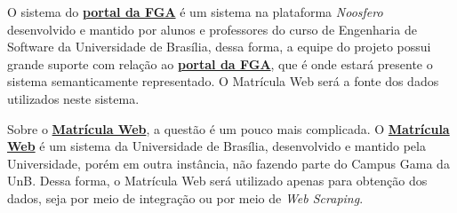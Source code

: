 
O sistema do \href{https://fga.unb.br/}{\textbf{portal da FGA}} é um sistema na plataforma \textit{Noosfero} desenvolvido e mantido por alunos e professores do curso de Engenharia de Software da Universidade de Brasília, dessa forma, a equipe do projeto possui grande suporte com relação ao \href{https://fga.unb.br/}{\textbf{portal da FGA}}, que é onde estará presente o sistema semanticamente representado. O Matrícula Web será a fonte dos dados utilizados neste sistema.

Sobre o \href{http://matriculaweb.unb.br}{\textbf{Matrícula Web}}, a questão é um pouco mais complicada. O \href{http://matriculaweb.unb.br}{\textbf{Matrícula Web}} é um sistema da Universidade de Brasília, desenvolvido e mantido pela Universidade, porém em outra instância, não fazendo parte do Campus Gama da UnB. Dessa forma, o Matrícula Web será utilizado apenas para obtenção dos dados, seja por meio de integração ou por meio de \textit{Web Scraping}.